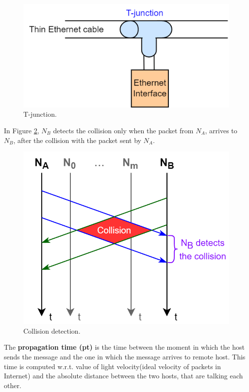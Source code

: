\begin{figure}[h]
\centering
\includegraphics[scale=0.5]{Images/Layer2/t_junction}
\caption{\footnotesize{T-junction.}}\label{t_junction}
\end{figure}
In Figure \ref{collision}, $N_B$ detects the collision only when the packet from $N_A$, arrives to $N_B$, after the collision with the packet sent by $N_A$.\\
\begin{figure}[h]
\centering
\includegraphics[scale=0.35]{Images/Layer2/collision}
\caption{\footnotesize{Collision detection.}}\label{collision}
\end{figure}
The \textbf{propagation time (pt)} is the time between the moment in which the host sends the message and  the one in which the message arrives to remote host.
This time is computed w.r.t. value of light velocity(ideal velocity of packets in Internet) and the absolute distance between the two hosts, that are talking each other.
